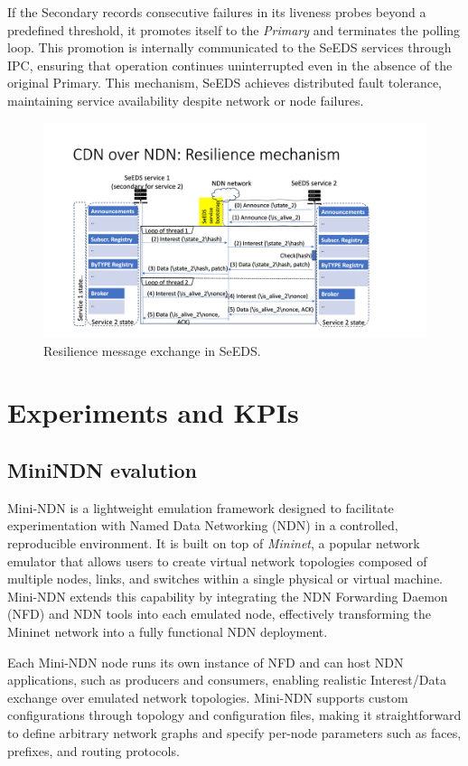 \documentclass{article}
\begin{document}
If the Secondary records consecutive failures in its liveness probes beyond a predefined threshold, it promotes itself to the \emph{Primary} and terminates the polling loop. This promotion is internally communicated to the SeEDS services through IPC, ensuring that operation continues uninterrupted even in the absence of the original Primary. This mechanism, SeEDS achieves distributed fault tolerance, maintaining service availability despite network or node failures.

\begin{figure}[H]
    \centering
    \includegraphics[width=0.8\linewidth]{images/resilience.png}
    \caption{Resilience message exchange in SeEDS.}
    \label{fig:resilience}
\end{figure}

\section{Experiments and KPIs}

\subsection{MiniNDN evalution}

Mini-NDN is a lightweight emulation framework designed to facilitate experimentation with Named Data Networking (NDN) in a controlled, reproducible environment. It is built on top of \textit{Mininet}, a popular network emulator that allows users to create virtual network topologies composed of multiple nodes, links, and switches within a single physical or virtual machine. Mini-NDN extends this capability by integrating the NDN Forwarding Daemon (NFD) and NDN tools into each emulated node, effectively transforming the Mininet network into a fully functional NDN deployment.

Each Mini-NDN node runs its own instance of NFD and can host NDN applications, such as producers and consumers, enabling realistic Interest/Data exchange over emulated network topologies. Mini-NDN supports custom configurations through topology and configuration files, making it straightforward to define arbitrary network graphs and specify per-node parameters such as faces, prefixes, and routing protocols.
\end{document}
